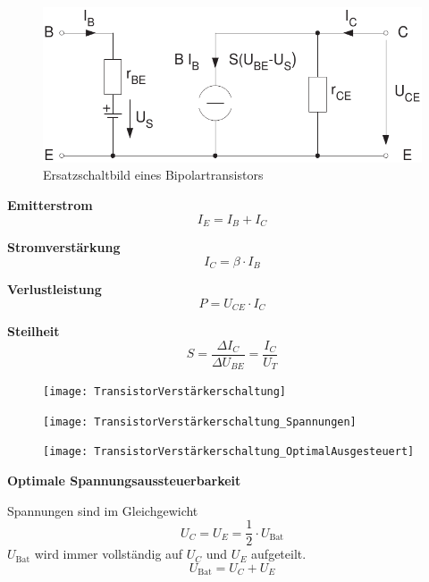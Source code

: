 \documentclass[a5paper, 12pt, twoside]{scrartcl}
\begin{document}
\begin{figure}[H]
  \centering
  \includegraphics[width=.6\textwidth]{ESBTransistor}
  \caption{Ersatzschaltbild eines Bipolartransistors}
\end{figure}

\textbf{Emitterstrom}
\[I_E = I_B + I_C\]

\textbf{Stromverstärkung}
\[I_C = \beta \cdot I_B\]

\textbf{Verlustleistung}
\[P = U_{CE} \cdot I_C\]

\textbf{Steilheit}
\[S = \frac{\Delta I_C}{\Delta U_{BE}} = \frac{I_C}{U_T}\]

\begin{figure}[H]
  \centering
  \texttt{[image: TransistorVerstärkerschaltung]}
\end{figure}

\begin{figure}[H]
  \centering
  \texttt{[image: TransistorVerstärkerschaltung\_Spannungen]}
\end{figure}

\begin{figure}[H]
  \centering
  \texttt{[image: TransistorVerstärkerschaltung\_OptimalAusgesteuert]}
\end{figure}

\textbf{Optimale Spannungsaussteuerbarkeit}

Spannungen sind im Gleichgewicht
\[U_C = U_E = \frac{1}{2} \cdot U_{\text{Bat}}\]
\(U_{\text{Bat}}\) wird immer vollständig auf \(U_C\) und \(U_E\) aufgeteilt.
\[U_{\text{Bat}} = U_C + U_E\]
\end{document}
